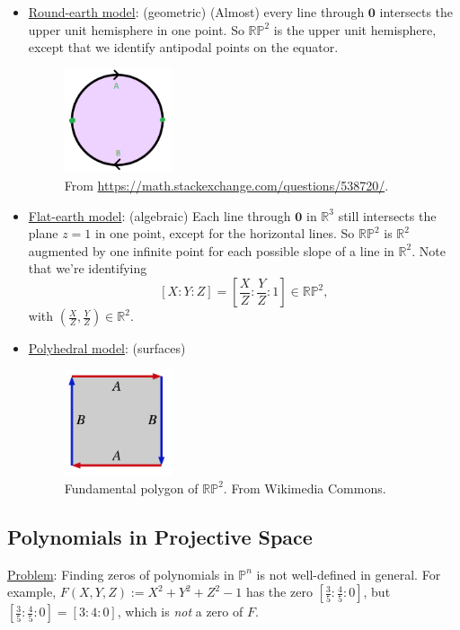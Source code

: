 \documentclass[12pt]{article}
\newcommand{\real}{\mathbb{R}}
\newcommand{\ita}[1]{\textit{#1}}
\theoremstyle{definition}
\begin{document}
\begin{itemize}
    \item \underline{Round-earth model}: (geometric) (Almost) every line through $\mathbf{0}$ intersects the upper unit hemisphere in one point. So $\real\mathbb{P}^2$ is the upper unit hemisphere, except that we identify antipodal points on the equator.
    \begin{figure}[H]
        \centering
        \includegraphics[width=0.3\textwidth]{28.png}
        \caption{From \url{https://math.stackexchange.com/questions/538720/}.}
    \end{figure}
    \item \underline{Flat-earth model}: (algebraic) Each line through $\mathbf{0}$ in $\real^3$ still intersects the plane $z=1$ in one point, except for the horizontal lines. So $\real\mathbb{P}^2$ is $\real^2$ augmented by one infinite point for each possible slope of a line in $\real^2$. Note that we're identifying
    \[[X:Y:Z]=\left[\frac{X}{Z}:\frac{Y}{Z}:1\right]\in\real\mathbb{P}^2,\]
    with $\left(\frac{X}{Z},\frac{Y}{Z}\right)\in\real^2$.
    \item \underline{Polyhedral model}: (surfaces) 
    \begin{figure}[H]
        \centering
        \includegraphics[width=0.3\textwidth]{27.png}
        \caption{Fundamental polygon of $\real\mathbb{P}^2$. From Wikimedia Commons.}
    \end{figure}
\end{itemize}
\subsection{Polynomials in Projective Space}
\underline{Problem}: Finding zeros of polynomials in $\mathbb{P}^n$ is not well-defined in general. For example, $F(X,Y,Z):=X^2+Y^2+Z^2-1$ has the zero $\left[\frac{3}{5}:\frac{4}{5}:0\right]$, but $\left[\frac{3}{5}:\frac{4}{5}:0\right]=[3:4:0]$, which is \ita{not} a zero of $F$.
\end{document}
